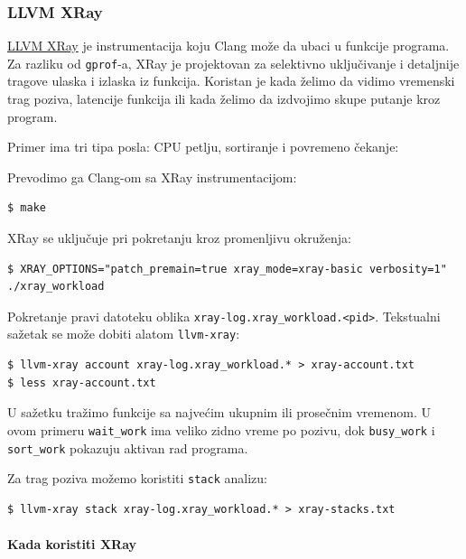 \subsubsection{LLVM XRay}\label{llvm-xray}

\href{https://llvm.org/docs/XRay.html}{LLVM XRay} je instrumentacija koju Clang može da ubaci u funkcije programa. Za razliku od \texttt{gprof}-a, XRay je projektovan za selektivno uključivanje i detaljnije tragove ulaska i izlaska iz funkcija. Koristan je kada želimo da vidimo vremenski trag poziva, latencije funkcija ili kada želimo da izdvojimo skupe putanje kroz program.

Primer ima tri tipa posla: CPU petlju, sortiranje i povremeno čekanje:


Prevodimo ga Clang-om sa XRay instrumentacijom:

\begin{verbatim}
$ make
\end{verbatim}

XRay se uključuje pri pokretanju kroz promenljivu okruženja:

\begin{verbatim}
$ XRAY_OPTIONS="patch_premain=true xray_mode=xray-basic verbosity=1" ./xray_workload
\end{verbatim}

Pokretanje pravi datoteku oblika \texttt{xray-log.xray\_workload.\textless{}pid\textgreater{}}. Tekstualni sažetak se može dobiti alatom \texttt{llvm-xray}:

\begin{verbatim}
$ llvm-xray account xray-log.xray_workload.* > xray-account.txt
$ less xray-account.txt
\end{verbatim}

U sažetku tražimo funkcije sa najvećim ukupnim ili prosečnim vremenom. U ovom primeru \texttt{wait\_work} ima veliko zidno vreme po pozivu, dok \texttt{busy\_work} i \texttt{sort\_work} pokazuju aktivan rad programa.

Za trag poziva možemo koristiti \texttt{stack} analizu:

\begin{verbatim}
$ llvm-xray stack xray-log.xray_workload.* > xray-stacks.txt
\end{verbatim}

\paragraph{Kada koristiti XRay}\label{xray-kada}

